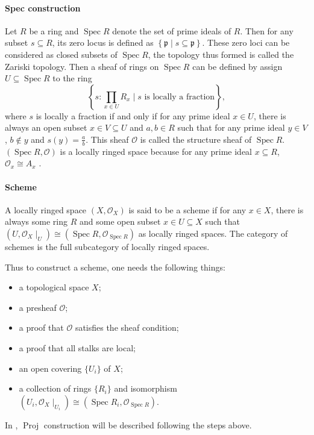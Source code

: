 \documentclass[a4paper,UKenglish,cleveref, autoref, thm-restate]{lipics-v2021}
\begin{document}
\paragraph*{Spec construction} Let $R$ be a ring and $\operatorname{Spec} R$ denote the set of prime ideals of $R$. Then for any subset $s \subseteq R$, its zero locus is defined as $\left\{\mathfrak{p} \mid s \subseteq \mathfrak{p}\right\}$. These zero loci can be considered as closed subsets of $\operatorname{Spec} R$, the topology thus formed is called the Zariski topology. Then a sheaf of rings on $\operatorname{Spec} R$ can be defined by assign $U \subseteq \operatorname{Spec} R$ to the ring
\[
\left\{s : \prod_{x \in U} R_x \mid s \text{~is locally a fraction}\right\},
\]
where $s$ is locally a fraction if and only if for any prime ideal $x \in U$, there is always an open subset $x \in V \subseteq U$ and $a, b \in R$ such that for any prime ideal $y \in V$, $b \not\in y$ and $s(y) = \frac{a}{b}$. This sheaf $\mathcal{O}$ is called the structure sheaf of $\operatorname{Spec}R$. $(\operatorname{Spec} R, \mathcal{O})$ is a locally ringed space because for any prime ideal $x\subseteq R$, $\mathcal{O}_{x}\cong A_x$ \cite{hartshorne1977graduate}.

\paragraph*{Scheme}

\begin{definition}[Scheme]
    A locally ringed space $(X, \mathcal{O}_X)$ is said to be a scheme if for any $x \in X$, there is always some ring $R$ and some open subset $x \in U \subseteq X$ such that $(U, \mathcal{O}_X\!\mid_U) \cong (\operatorname{Spec} R, \mathcal{O}_{\operatorname{Spec} R})$ as locally ringed spaces. The category of schemes is the full subcategory of locally ringed spaces.
\end{definition}

Thus to construct a scheme, one needs the following things:
\begin{itemize}
    \item a topological space $X$;
    \item a presheaf $\mathcal{O}$;
    \item a proof that $\mathcal{O}$ satisfies the sheaf condition;
    \item a proof that all stalks are local;
    \item an open covering $\{U_i\}$ of $X$;
    \item a collection of rings $\{R_i\}$ and isomorphism $(U_i, \mathcal{O}_X\!\mid_{U_i})\cong(\operatorname{Spec}R_i, \mathcal{O}_{\operatorname{Spec} R})$.
\end{itemize}
In , $\operatorname{Proj}$ construction will be described following the steps above.
\end{document}
